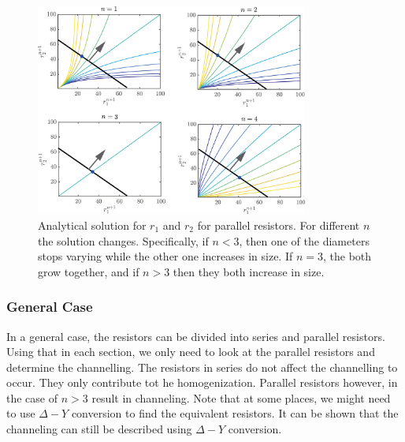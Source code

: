 \begin{figure}[!h]
  \centerline{\includegraphics[width=0.8\textwidth]{./Figs/par_resistors}}
  \caption{Analytical solution for $r_1$ and $r_2$ for parallel
    resistors. For different $n$ the solution changes. Specifically,
    if $n<3$, then one of the diameters stops varying while the other
    one increases in size. If $n=3$, the both grow together, and if
    $n>3$ then they both increase in size. }
\label{anal-par}
\end{figure}  


\subsubsection*{General Case}
%
In a general case, the resistors can be divided into series and
parallel resistors. Using that in each section, we only need to look
at the parallel resistors and determine the channelling. The resistors
in series do not affect the channelling to occur. They only contribute
tot he homogenization. Parallel resistors however, in the case of
$n>3$ result in channeling. Note that at some places, we might need to
use $\Delta-Y$ conversion to find the equivalent resistors. It can be
shown that the channeling can still be described using $\Delta-Y$
conversion.


